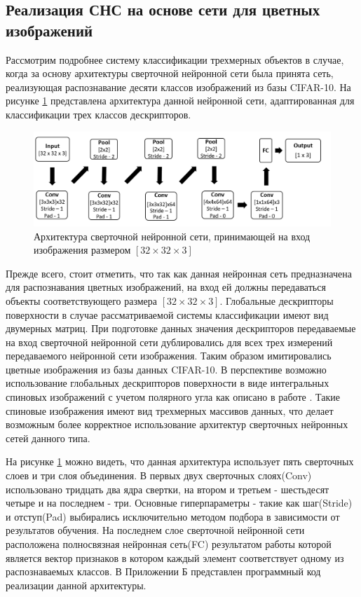 \documentclass[14pt]{article}
\numberwithin{figure}{section}
\numberwithin{equation}{section}
\begin{document}
 \subsection{Реализация СНС на основе сети для цветных изображений}\label{ssec4.2}

Рассмотрим подробнее систему классификации трехмерных объектов в случае, когда за основу архитектуры сверточной нейронной сети была принята сеть, реализующая распознавание десяти классов изображений из базы CIFAR-10. На рисунке \ref{ris:9} представлена архитектура данной нейронной сети, адаптированная для классификации трех классов дескрипторов.

\begin{figure}[h]
   \begin{center}
       \includegraphics[scale=0.7] {9.JPG}
       \caption{Архитектура сверточной нейронной сети, принимающей на вход изображения размером $[32 \times 32 \times 3]$}
       \label{ris:9}
   \end{center}
\end{figure}

Прежде всего, стоит отметить, что так как данная нейронная сеть предназначена для распознавания цветных изображений, на вход ей должны передаваться объекты соответствующего размера $[32 \times 32 \times 3]$. Глобальные дескрипторы поверхности в случае рассматриваемой системы классификации имеют вид двумерных матриц. При подготовке данных значения дескрипторов передаваемые на вход сверточной нейронной сети дублировались для всех трех измерений передаваемого нейронной сети изображения. Таким образом имитировались цветные изображения из базы данных CIFAR-10. В перспективе возможно использование глобальных дескрипторов поверхности в виде интегральных спиновых изображений с учетом полярного угла как описано в работе \cite{Chernikoff}. Такие спиновые изображения имеют вид трехмерных массивов данных, что делает возможным более корректное использование архитектур сверточных нейронных сетей данного типа.

На рисунке \ref{ris:9} можно видеть, что данная архитектура использует пять сверточных слоев и три слоя объединения. В первых двух сверточных слоях(Conv) использовано тридцать два ядра свертки, на втором и третьем - шестьдесят четыре и на последнем - три. Основные гиперпараметры - такие как шаг(Stride) и отступ(Pad) выбирались исключительно методом подбора в зависимости от результатов обучения. На последнем слое сверточной нейронной сети расположена полносвязная нейронная сеть(FC) результатом работы которой является вектор признаков в котором каждый элемент соответствует одному из распознаваемых классов. В Приложении Б представлен программный код реализации данной архитектуры.
\end{document}
